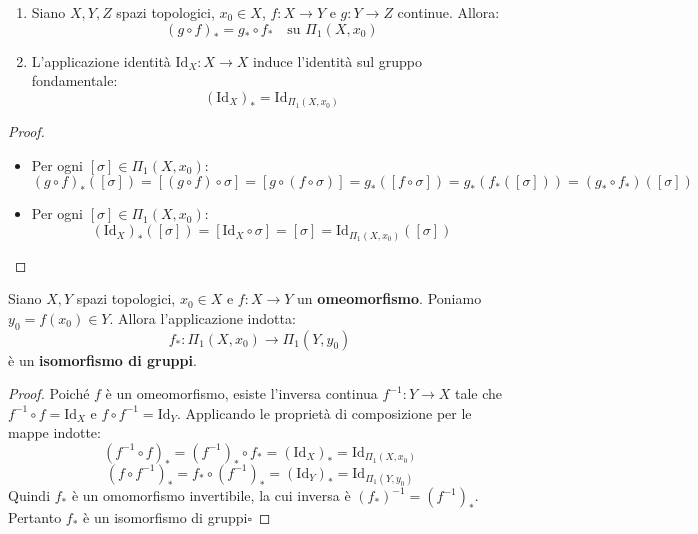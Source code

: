 \vspace{1em}

\begin{prop}
\begin{enumerate}[label=\alph*)]
    \item Siano $X, Y, Z$ spazi topologici, $x_0 \in X$, $f: X \to Y$ e $g: Y \to Z$ continue. Allora:
    \[
    (g \circ f)_* = g_* \circ f_* \quad \text{su } \Pi_1(X, x_0)
    \]
    \item L'applicazione identità $\mathrm{Id}_X: X \to X$ induce l'identità sul gruppo fondamentale:
    \[
    (\mathrm{Id}_X)_* = \mathrm{Id}_{\Pi_1(X, x_0)}
    \]
\end{enumerate}
\end{prop}

\begin{proof}
\begin{itemize}
    \item[a)] Per ogni $[\sigma] \in \Pi_1(X, x_0)$:
    \[
    (g \circ f)_*([\sigma]) = [(g \circ f) \circ \sigma] = [g \circ (f \circ \sigma)] = g_*([f \circ \sigma]) = g_*(f_*([\sigma])) = (g_* \circ f_*)([\sigma])
    \]
    \item[b)] Per ogni $[\sigma] \in \Pi_1(X, x_0)$:
    \[
    (\mathrm{Id}_X)_*([\sigma]) = [\mathrm{Id}_X \circ \sigma] = [\sigma] = \mathrm{Id}_{\Pi_1(X, x_0)}([\sigma])
    \]
\end{itemize}
\end{proof}

\vspace{1.5em}

\begin{teo}
Siano $X, Y$ spazi topologici, $x_0 \in X$ e $f: X \to Y$ un \textbf{omeomorfismo}. Poniamo $y_0 = f(x_0) \in Y$.
Allora l'applicazione indotta:
\[
f_*: \Pi_1(X, x_0) \longrightarrow \Pi_1(Y, y_0)
\]
è un \textbf{isomorfismo di gruppi}.
\end{teo}

\begin{proof}
Poiché $f$ è un omeomorfismo, esiste l'inversa continua $f^{-1}: Y \to X$ tale che $f^{-1} \circ f = \mathrm{Id}_X$ e $f \circ f^{-1} = \mathrm{Id}_Y$.
Applicando le proprietà di composizione per le mappe indotte:
\[
(f^{-1} \circ f)_* = (f^{-1})_* \circ f_* = (\mathrm{Id}_X)_* = \mathrm{Id}_{\Pi_1(X, x_0)}
\]
\[
(f \circ f^{-1})_* = f_* \circ (f^{-1})_* = (\mathrm{Id}_Y)_* = \mathrm{Id}_{\Pi_1(Y, y_0)}
\]
Quindi $f_*$ è un omomorfismo invertibile, la cui inversa è $(f_*)^{-1} = (f^{-1})_*$. Pertanto $f_*$ è un isomorfismo di gruppi\hfill$\square$
\end{proof}

